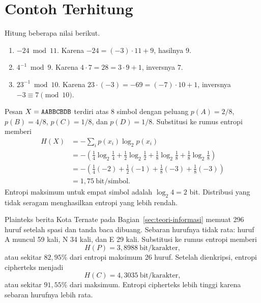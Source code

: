 \section{Contoh Terhitung}

\begin{example}
Hitung beberapa nilai berikut.
\begin{enumerate}
    \item $-24 \bmod 11$. Karena $-24 = (-3) \cdot 11 + 9$, hasilnya $9$.
    \item $4^{-1} \bmod 9$. Karena $4 \cdot 7 = 28 = 3 \cdot 9 + 1$, inversnya
          $7$.
    \item $23^{-1} \bmod 10$. Karena $23 \cdot (-3) = -69 = (-7) \cdot 10 + 1$,
          inversnya $-3 \equiv 7 \pmod{10}$.
\end{enumerate}
\end{example}

\begin{example}
Pesan $X = \texttt{AABBCBDB}$ terdiri atas 8 simbol dengan peluang $p(A)=2/8$,
$p(B)=4/8$, $p(C)=1/8$, dan $p(D)=1/8$. Substitusi ke rumus entropi memberi
\[
\begin{aligned}
H(X) &= -\sum_{i} p(x_i) \log_2 p(x_i)\\
     &= -\left(\tfrac14 \log_2 \tfrac14 + \tfrac12 \log_2 \tfrac12
        + \tfrac18 \log_2 \tfrac18 + \tfrac18 \log_2 \tfrac18\right)\\
     &= -\left(\tfrac14(-2) + \tfrac12(-1) + \tfrac18(-3) + \tfrac18(-3)\right)\\
     &= 1{,}75\ \text{bit/simbol}.
\end{aligned}
\]
Entropi maksimum untuk empat simbol adalah $\log_2 4 = 2$ bit. Distribusi yang
tidak seragam menghasilkan entropi yang lebih rendah.
\end{example}

\begin{example}
Plainteks berita Kota Ternate pada Bagian~\ref{sec:teori-informasi} memuat 296
huruf setelah spasi dan tanda baca dibuang. Sebaran hurufnya tidak rata: huruf A
muncul 59 kali, N 34 kali, dan E 29 kali. Substitusi ke rumus entropi memberi
\[ H(P) = 3{,}8988\ \text{bit/karakter}, \]
atau sekitar $82{,}95\%$ dari entropi maksimum 26 huruf. Setelah dienkripsi,
entropi cipherteks menjadi
\[ H(C) = 4{,}3035\ \text{bit/karakter}, \]
atau sekitar $91{,}55\%$ dari maksimum. Entropi cipherteks lebih tinggi karena
sebaran hurufnya lebih rata.
\end{example}
